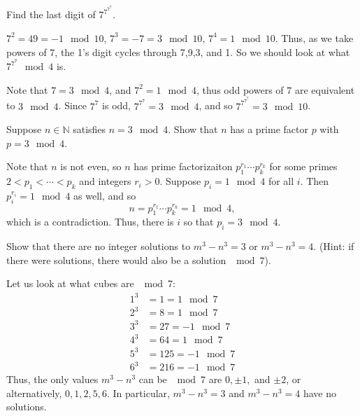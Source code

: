 \documentclass[11pt,dvipsnames]{book}
\numberwithin{figure}{section} %
\numberwithin{table}{section} %
\begin{document}
\begin{exercise} Find the last digit of $7^{7^{7^{7}}}$.

\begin{solution}
$7^2=49 = -1\mod 10$, $7^3 = -7 = 3\mod 10$, $7^4 = 1 \mod 10$. Thus, as we take powers of $7$, the 1's digit cycles through 7,9,3, and 1. So we should look at what $7^{7^7}\mod 4$ is.

Note that $7 = 3\mod 4$, and $7^2 = 1\mod 4$, thus odd powers of $7$ are equivalent to $3\mod 4$. Since $7^7$ is odd, $7^{7^7} = 3\mod 4$, and so $7^{7^{7^{7}}} = 3\mod 10$.
\end{solution}

\end{exercise}

\begin{exercise} Suppose $n\in\mathbb{N}$ satisfies $n = 3\mod 4$. Show that $n$ has a prime factor $p$ with $p = 3\mod 4$.

\begin{solution}

Note that $n$ is not even, so $n$ has prime factorizaiton $p_{1}^{r_{1}}\cdots p_{k}^{r_{k}}$ for some primes $2<p_{1}<\cdots < p_{k}$ and integers $r_{i}>0$. Suppose $p_{i} = 1 \mod 4$ for all $i$. Then $p_{i}^{r_{i}} = 1 \mod 4$ as well, and so
\[
n=p_{1}^{r_{1}}\cdots p_{k}^{r_{k}} = 1 \mod 4,
\]
which is a contradiction. Thus, there is $i$ so that $p_{i} = 3\mod 4$.

\end{solution}

\end{exercise}

\begin{exercise}
Show that there are no integer solutions to $m^3-n^3=3$ or $m^3-n^3=4$. (Hint: if there were solutions, there would also be a solution $\mod 7$).

\begin{solution}
Let us look at what cubes are $\mod 7$:
\begin{align*}
1^3 & =1 = 1 \mod 7 \\
2^3 & =8  = 1 \mod 7\\
3^3 & =27  = -1 \mod 7 \\
4^3 & =64  = 1 \mod 7\\
5^3 & =125 = -1 \mod 7\\
6^3 & = 216  = -1 \mod 7
\end{align*}
Thus, the only values $m^3-n^3$ can be $\mod 7$ are $0,\pm 1,$ and $\pm 2$, or alternatively, $0,1,2,5,6$. In particular, $m^3-n^3=3$ and $m^3-n^3=4$ have no solutions.

\end{solution}

\end{exercise}
\end{document}
